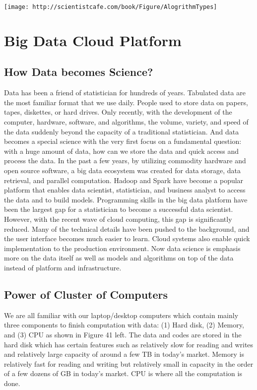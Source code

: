 \documentclass[
]{article}
\begin{document}
\texttt{[image: http://scientistcafe.com/book/Figure/AlogrithmTypes]}

\hypertarget{big-data-cloud-platform}{%
\section{Big Data Cloud Platform}\label{big-data-cloud-platform}}

\hypertarget{how-data-becomes-science}{%
\subsection{How Data becomes Science?}\label{how-data-becomes-science}}

Data has been a friend of statistician for hundreds of years. Tabulated
data are the most familiar format that we use daily. People used to
store data on papers, tapes, diskettes, or hard drives. Only recently,
with the development of the computer, hardware, software, and
algorithms, the volume, variety, and speed of the data suddenly beyond
the capacity of a traditional statistician. And data becomes a special
science with the very first focus on a fundamental question: with a huge
amount of data, how can we store the data and quick access and process
the data. In the past a few years, by utilizing commodity hardware and
open source software, a big data ecosystem was created for data storage,
data retrieval, and parallel computation. Hadoop and Spark have become a
popular platform that enables data scientist, statistician, and business
analyst to access the data and to build models. Programming skills in
the big data platform have been the largest gap for a statistician to
become a successful data scientist. However, with the recent wave of
cloud computing, this gap is significantly reduced. Many of the
technical details have been pushed to the background, and the user
interface becomes much easier to learn. Cloud systems also enable quick
implementation to the production environment. Now data science is
emphasis more on the data itself as well as models and algorithms on top
of the data instead of platform and infrastructure.

\hypertarget{power-of-cluster-of-computers}{%
\subsection{Power of Cluster of
Computers}\label{power-of-cluster-of-computers}}

We are all familiar with our laptop/desktop computers which contain
mainly three components to finish computation with data: (1) Hard disk,
(2) Memory, and (3) CPU as shown in Figure 41 left. The data and codes
are stored in the hard disk which has certain features such as
relatively slow for reading and writes and relatively large capacity of
around a few TB in today's market. Memory is relatively fast for reading
and writing but relatively small in capacity in the order of a few
dozens of GB in today's market. CPU is where all the computation is
done.
\end{document}
